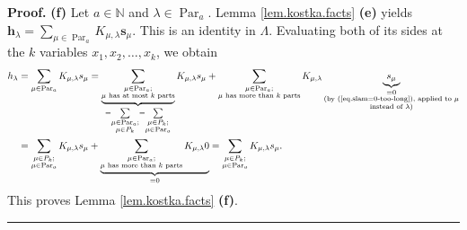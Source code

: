 \documentclass[numbers=enddot,12pt,final,onecolumn,notitlepage]{scrartcl}%
\theoremstyle{definition}
\newenvironment{proof}[1][Proof]{\noindent\textbf{#1.} }{\ \rule{0.5em}{0.5em}}
\let\sumnonlimits\sum
\renewcommand{\sum}{\sumnonlimits\limits}
\begin{document}
\begin{proof}
\textbf{(f)} Let $a\in\mathbb{N}$ and $\lambda\in\operatorname*{Par}%
\nolimits_{a}$. Lemma \ref{lem.kostka.facts} \textbf{(e)} yields
$\mathbf{h}_{\lambda}=\sum_{\mu\in\operatorname*{Par}\nolimits_{a}}%
K_{\mu,\lambda}\mathbf{s}_{\mu}$. This is an identity in $\Lambda$. Evaluating
both of its sides at the $k$ variables $x_{1},x_{2},\ldots,x_{k}$, we obtain%
\begin{align*}
h_{\lambda}  &  =\sum_{\mu\in\operatorname*{Par}\nolimits_{a}}K_{\mu,\lambda
}s_{\mu}=\underbrace{\sum_{\substack{\mu\in\operatorname*{Par}\nolimits_{a}%
;\\\mu\text{ has at most }k\text{ parts}}}}_{=\sum_{\substack{\mu
\in\operatorname*{Par}\nolimits_{a};\\\mu\in P_{k}}}=\sum_{\substack{\mu\in
P_{k};\\\mu\in\operatorname*{Par}\nolimits_{a}}}}K_{\mu,\lambda}s_{\mu}%
+\sum_{\substack{\mu\in\operatorname*{Par}\nolimits_{a};\\\mu\text{ has more
than }k\text{ parts}}}K_{\mu,\lambda}\underbrace{s_{\mu}}%
_{\substack{=0\\\text{(by (\ref{eq.slam=0-too-long}), applied to }%
\mu\\\text{instead of }\lambda\text{)}}}\\
&  =\sum_{\substack{\mu\in P_{k};\\\mu\in\operatorname*{Par}\nolimits_{a}%
}}K_{\mu,\lambda}s_{\mu}+\underbrace{\sum_{\substack{\mu\in\operatorname*{Par}%
\nolimits_{a};\\\mu\text{ has more than }k\text{ parts}}}K_{\mu,\lambda}%
0}_{=0}=\sum_{\substack{\mu\in P_{k};\\\mu\in\operatorname*{Par}\nolimits_{a}%
}}K_{\mu,\lambda}s_{\mu}.
\end{align*}
This proves Lemma \ref{lem.kostka.facts} \textbf{(f)}.
\end{proof}
\end{document}
